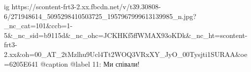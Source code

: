  
 
 
 
 

\ifcmt
  ig https://scontent-frt3-2.xx.fbcdn.net/v/t39.30808-6/271948614_5095298410503725_1957967999613139985_n.jpg?_nc_cat=101&ccb=1-5&_nc_sid=b9115d&_nc_ohc=JCKHKf5ffWMAX93oKDk&_nc_ht=scontent-frt3-2.xx&oh=00_AT_2tMzlhu9Ucl4Tt2WOQ3VRxXY_JyO_00Tysjti1SURAA&oe=6205E641
  @caption @label 11: Ми співали!
\fi
